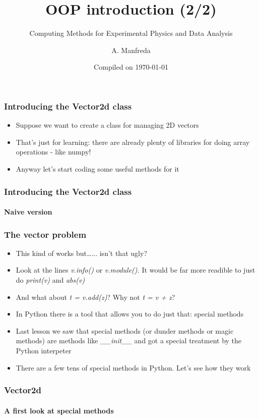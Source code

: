 \documentclass[9pt]{beamer}
\title{OOP introduction (2/2)}
\subtitle{Computing Methods for Experimental Physics and Data Analysis}
\date{Compiled on \today}
\author{A. Manfreda}
\institute[INFN]{INFN--Pisa}
\begin{document}
\titleframe


\begin{frame}
  \frametitle{Introducing the Vector2d class}
  
  \begin{itemize}
    \item Suppose we want to create a class for managing 2D vectors
    \bigskip
    \item That's just for learning: there are already plenty of libraries for
          doing array operations - like numpy!
    \bigskip
    \item Anyway let's start coding some useful methods for it
  \end{itemize}
  
\end{frame}


\begin{frame}
  \frametitle{Introducing the Vector2d class}
  \framesubtitle{Naive version}
  
\end{frame}


\begin{frame}
  \frametitle{The vector problem}
  
  \begin{itemize}
    \item This kind of works but\dots... isn't that ugly?
    \medskip
    \item Look at the lines \emph{v.info()} or \emph{v.module().}
          It would be far more readible to just do \emph{print(v)} and \emph{abs(v)}
    \medskip
    \item And what about \emph{t = v.add(z)}? Why not \emph{t = v + z}?
    \medskip
    \item In Python there is a tool that allows you to do just that: \alert{special methods}
    \medskip
    \item Last lesson we saw that special methods (or dunder methods or 
          magic methods) are methods like \emph{\_\_init\_\_} and got a special
          treatment by the Python interpeter
    \medskip
    \item There are a few tens of special methods in Python. Let's see how they work
  \end{itemize}
  
\end{frame}

  
\begin{frame}
  \frametitle{Vector2d}
  \framesubtitle{A first look at special methods}
  
\end{frame}
\end{document}
